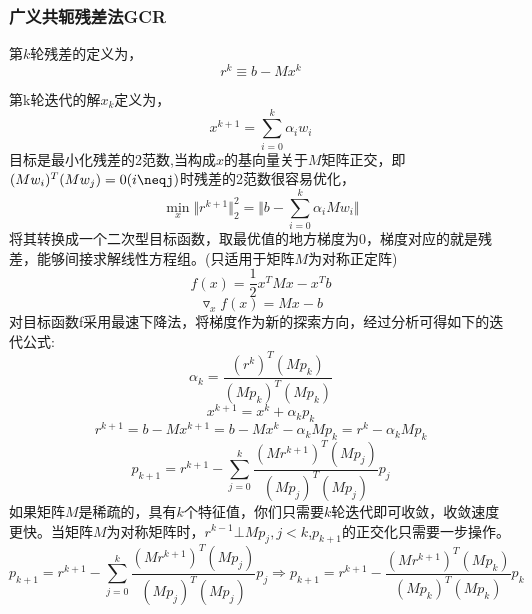 \documentclass[12pt]{article}
\begin{document}
\subsubsection{广义共轭残差法GCR}
\qquad 第$k$轮残差的定义为，
\begin{equation}
  r^k \equiv b - Mx^k
\end{equation}

\qquad 第k轮迭代的解$x_k$定义为，
\begin{equation}
  x^{k+1} = \sum_{i=0}^{k} \alpha_i w_i
\end{equation}
\qquad 目标是最小化残差的2范数,当构成$x$的基向量关于$M$矩阵正交，即$(Mw_i)^T(Mw_j)=0(i\neqj)$时残差的2范数很容易优化，
\begin{equation}
  \mathop{\min}_{x} \Vert r^{k+1} \Vert_2^2 = \Vert b - \sum_{i=0}^{k} \alpha_i M w_i \Vert
\end{equation}
\qquad 将其转换成一个二次型目标函数，取最优值的地方梯度为0，梯度对应的就是残差，能够间接求解线性方程组。(只适用于矩阵$M$为对称正定阵)
\begin{equation}
  f(x) = \frac{1}{2}x^TMx-x^Tb
\end{equation}
\begin{equation}
  \triangledown_xf(x) = Mx-b
\end{equation}
\qquad 对目标函数f采用最速下降法，将梯度作为新的探索方向，经过分析可得如下的迭代公式:
\begin{equation}  
  \alpha_k= \frac{\left(r^k\right)^T\left(M p_k\right)}{\left(M p_k\right)^T\left(M p_k\right)} 
\end{equation}
\begin{equation}
  x^{k+1} =x^k+\alpha_k p_k
\end{equation}
\begin{equation}
  r^{k+1} =b-M x^{k+1} =b-M x^k-\alpha_k M p_k =r^k-\alpha_k M p_k
\end{equation}
\begin{equation}
  p_{k+1} =r^{k+1}-\sum_{j=0}^k \frac{\left(M r^{k+1}\right)^T\left(M p_j\right)}{\left(M p_j\right)^T\left(M p_j\right)} p_j
\end{equation}
\qquad 如果矩阵$M$是稀疏的，具有$k$个特征值，你们只需要$k$轮迭代即可收敛，收敛速度更快。当矩阵$M$为对称矩阵时，$r^{k-1} \bot Mp_j,j<k$,$p_{k+1}$的正交化只需要一步操作。
\begin{equation}
  p_{k+1}=r^{k+1}-\sum_{j=0}^k \frac{\left(M r^{k+1}\right)^T\left(M p_j\right)}{\left(M p_j\right)^T\left(M p_j\right)} p_j \Rightarrow p_{k+1}=r^{k+1}-\frac{\left(M r^{k+1}\right)^T\left(M p_k\right)}{\left(M p_k\right)^T\left(M p_k\right)} p_k
\end{equation}
\end{document}
